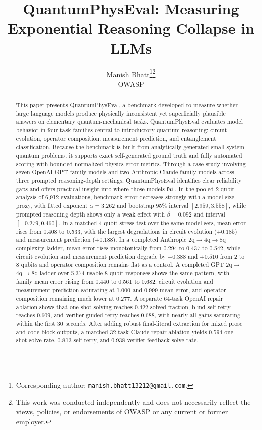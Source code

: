 \documentclass[11pt]{article}
\title{QuantumPhysEval: Measuring Exponential Reasoning Collapse in LLMs}
\author{%
  Manish Bhatt\thanks{Corresponding author: \texttt{manish.bhatt13212@gmail.com}.}\thanks{This work was conducted independently and does not necessarily reflect the views, policies, or endorsements of OWASP or any current or former employer.}\\
  OWASP
}
\date{}
\begin{document}
\maketitle

\begin{abstract}
This paper presents QuantumPhysEval, a benchmark developed to measure whether large language models produce physically inconsistent yet superficially plausible answers on elementary quantum-mechanical tasks. QuantumPhysEval evaluates model behavior in four task families central to introductory quantum reasoning: circuit evolution, operator composition, measurement prediction, and entanglement classification. Because the benchmark is built from analytically generated small-system quantum problems, it supports exact self-generated ground truth and fully automated scoring with bounded normalized physics-error metrics. Through a case study involving seven OpenAI GPT-family models and two Anthropic Claude-family models across three prompted reasoning-depth settings, QuantumPhysEval identifies clear reliability gaps and offers practical insight into where those models fail. In the pooled 2-qubit analysis of 6{,}912 evaluations, benchmark error decreases strongly with a model-size proxy, with fitted exponent $\alpha=3.262$ and bootstrap 95\% interval $[2.959, 3.558]$, while prompted reasoning depth shows only a weak effect with $\beta=0.092$ and interval $[-0.279, 0.460]$. In a matched 4-qubit stress test over the same model sets, mean error rises from 0.408 to 0.533, with the largest degradations in circuit evolution ($+0.185$) and measurement prediction ($+0.188$). In a completed Anthropic 2q$\rightarrow$4q$\rightarrow$8q complexity ladder, mean error rises monotonically from 0.294 to 0.437 to 0.542, while circuit evolution and measurement prediction degrade by $+0.388$ and $+0.510$ from 2 to 8 qubits and operator composition remains flat as a control. A completed GPT 2q$\rightarrow$4q$\rightarrow$8q ladder over 5{,}374 usable 8-qubit responses shows the same pattern, with family mean error rising from 0.440 to 0.561 to 0.682, circuit evolution and measurement prediction saturating at 1.000 and 0.999 mean error, and operator composition remaining much lower at 0.277. A separate 64-task OpenAI repair ablation shows that one-shot solving reaches 0.422 solved fraction, blind self-retry reaches 0.609, and verifier-guided retry reaches 0.688, with nearly all gains saturating within the first 30 seconds. After adding robust final-literal extraction for mixed prose and code-block outputs, a matched 32-task Claude repair ablation yields 0.594 one-shot solve rate, 0.813 self-retry, and 0.938 verifier-feedback solve rate.
\end{abstract}
\end{document}
